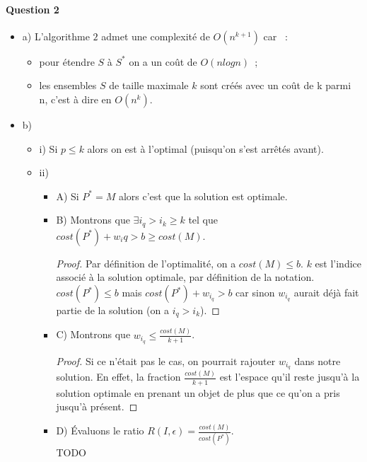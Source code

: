 \paragraph{Question 2}
\begin{itemize}
\item a) L'algorithme $2$ admet une complexité de $O(n^{k+1})$ car ~:
\begin{itemize}
\item pour étendre $S$ à $S^*$ on a un coût de $O(nlogn)$~;
\item les ensembles $S$ de taille maximale $k$ sont créés avec un coût
de k parmi n, c'est à dire en $O(n^k)$.
\end{itemize}
\item b)
\begin{itemize}
\item i) Si $p \leq k$ alors on est à l'optimal (puisqu'on s'est
arrêtés avant).
\item ii)
\begin{itemize}
\item A) Si $P^*=M$ alors c'est que la solution est optimale.
\item B) Montrons que $\exists i_q > i_k \geq k$ tel que
$cost(P^*)+w_iq > b \geq cost(M)$.
\begin{proof}
Par définition de l'optimalité, on a $cost(M) \leq b$. $k$ est
l'indice associé à la solution optimale, par définition de la
notation. \\
$cost(P^*) \leq b$ mais $cost(P^*) + w_{i_q} > b$ car sinon $w_{i_q}$
aurait déjà fait partie de la solution (on a $i_q > i_k$). 
\end{proof}
\item C) Montrons que $w_{i_q} \leq \frac{cost(M)}{k+1}$.
\begin{proof}
Si ce n'était pas le cas, on pourrait rajouter $w_{i_q}$ dans
notre solution. En effet, la fraction $\frac{cost(M)}{k+1}$ est
l'espace qu'il reste jusqu'à la solution optimale en prenant un objet
de plus que ce qu'on a pris jusqu'à présent.
\end{proof}
\item D) Évaluons le ratio $R(I, \epsilon)
= \frac{cost(M)}{cost(P^*)}$. \\
TODO
\end{itemize}
\end{itemize}
\end{itemize}
